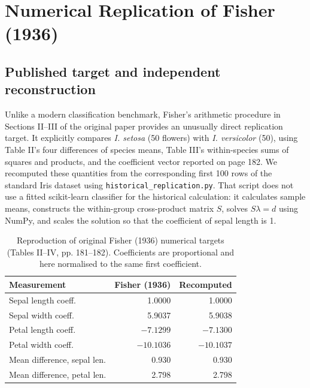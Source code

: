 \documentclass[11pt]{article}
\begin{document}
\section{Numerical Replication of Fisher (1936)}
\subsection{Published target and independent reconstruction}
Unlike a modern classification benchmark, Fisher's arithmetic procedure in Sections II--III of the original paper provides an unusually direct replication target. It explicitly compares \textit{I. setosa} (50 flowers) with \textit{I. versicolor} (50), using Table II's four differences of species means, Table III's within-species sums of squares and products, and the coefficient vector reported on page 182. We recomputed these quantities from the corresponding first 100 rows of the standard Iris dataset using \texttt{historical\_replication.py}. That script does not use a fitted scikit-learn classifier for the historical calculation: it calculates sample means, constructs the within-group cross-product matrix $S$, solves $S\lambda=d$ using NumPy, and scales the solution so that the coefficient of sepal length is 1.

\begin{table}[t]
\centering\small
\begin{tabular}{lrr}
\toprule
Measurement & Fisher (1936) & Recomputed \\
\midrule
Sepal length coeff. & 1.0000 & 1.0000 \\
Sepal width coeff. & 5.9037 & 5.9038 \\
Petal length coeff. & $-7.1299$ & $-7.1300$ \\
Petal width coeff. & $-10.1036$ & $-10.1037$ \\
\midrule
Mean difference, sepal len. & 0.930 & 0.930 \\
Mean difference, petal len. & 2.798 & 2.798 \\
\bottomrule
\end{tabular}
\caption{Reproduction of original Fisher (1936) numerical targets (Tables II--IV, pp. 181--182). Coefficients are proportional and here normalised to the same first coefficient.}
\label{tab:fisher}
\end{table}
\end{document}

